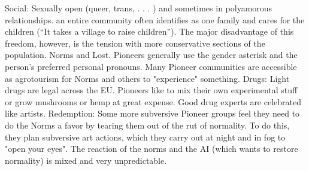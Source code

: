Social: Sexually open (queer, trans, . . . ) and sometimes in polyamorous relationships. an entire community often identifies as one family and cares for the children (“It takes a village to raise children”).
The major disadvantage of this freedom, however, is the tension with more conservative sections of the population. Norms and Lost. Pioneers generally use the gender asterisk and the person's preferred personal pronouns. Many Pioneer communities are accessible as agrotourism for Norms and others to "experience" something.
Drugs: Light drugs are legal across the EU. Pioneers like to mix their own experimental stuff or grow mushrooms or hemp at great expense. Good drug experts are celebrated like artists.
Redemption: Some more subversive Pioneer groups feel they need to do the Norms a favor by tearing them out of the rut of normality. To do this, they plan subversive art actions, which they carry out at night and in fog to "open your eyes". The reaction of the norms and the AI (which wants to restore normality) is mixed and very unpredictable.


